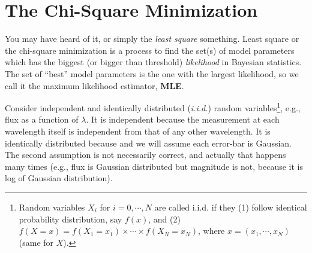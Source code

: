 \section{The Chi-Square Minimization}
You may have heard of it, or simply the \textit{least square} something. Least square or the chi-square minimization is a process to find the set(s) of model parameters which has the biggest (or bigger than threshold) \textit{likelihood} in Bayesian statistics. The set of ``best'' model parameters is the one with the largest likelihood, so we call it the maximum likelihood estimator, \textbf{MLE}.

Consider independent and identically distributed (\textit{i.i.d.}) random variables\footnote{Random variables $ X_{i} $ for $ i = 0, \cdots, N $ are called i.i.d. if they (1) follow identical probability distribution, say $ f(x) $, and (2) $ f(X = x) = f(X_1 = x_1) \times \cdots \times f(X_N = x_N) $, where $ x = (x_1, \cdots , x_N) $ (same for $ X $). }, e.g., flux as a function of $ \lambda $. It is independent because the measurement at each wavelength itself is independent from that of any other wavelength. It is identically distributed because and we will assume each error-bar is Gaussian. The second assumption is not necessarily correct, and actually that happens many times (e.g., flux is Gaussian distributed but magnitude is not, because it is log of Gaussian distribution).


